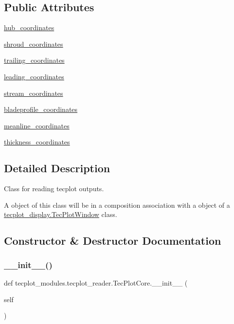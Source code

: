 \subsection*{Public Attributes}
\begin{DoxyCompactItemize}
\item 
\hyperlink{a00118_a2ccc38e7f7503e06d5c5fad58a071f80}{hub\+\_\+coordinates}
\item 
\hyperlink{a00118_a583d4851d722f76e18ec7841357b4ea7}{shroud\+\_\+coordinates}
\item 
\hyperlink{a00118_ab6edfe4cfa33db98eb1414228f78a303}{trailing\+\_\+coordinates}
\item 
\hyperlink{a00118_af991756a166df02da0a122d8d7c5c372}{leading\+\_\+coordinates}
\item 
\hyperlink{a00118_a4c8e60241684e96d45eabfb99e6955fd}{stream\+\_\+coordinates}
\item 
\hyperlink{a00118_abd9898f018cbb1686522d50721f851a7}{bladeprofile\+\_\+coordinates}
\item 
\hyperlink{a00118_a33fc4c19a7badee5e2a88f3be97f8efb}{meanline\+\_\+coordinates}
\item 
\hyperlink{a00118_a894f4ab5042e885fa8349c50c37059ac}{thickness\+\_\+coordinates}
\end{DoxyCompactItemize}


\subsection{Detailed Description}
Class for reading tecplot outputs. 

A object of this class will be in a composition association with a object of a \hyperlink{a00110}{tecplot\+\_\+display.\+Tec\+Plot\+Window} class. 

\subsection{Constructor \& Destructor Documentation}
\hypertarget{a00118_a15954180c0b4a9677efd980873a91773}{}\label{a00118_a15954180c0b4a9677efd980873a91773} 
\subsubsection{\texorpdfstring{\+\_\+\+\_\+init\+\_\+\+\_\+()}{\_\_init\_\_()}}
{\footnotesize\ttfamily def tecplot\+\_\+modules.\+tecplot\+\_\+reader.\+Tec\+Plot\+Core.\+\_\+\+\_\+init\+\_\+\+\_\+ (\begin{DoxyParamCaption}\item[{}]{self }\end{DoxyParamCaption})}



